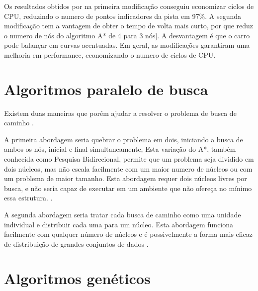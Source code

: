 \begin{minipage}{\linewidth}
	\label{fig:GameCarPista}
\end{minipage}

Os resultados obtidos por \cite{JungTing} na primeira modificação conseguiu economizar ciclos de CPU, reduzindo o numero de pontos indicadores da pista em 97\%. A segunda modificação tem a vantagem de obter o tempo de volta mais curto, por que reduz o numero de nós do algoritmo A* de 4 para 3 nós]. A desvantagem é que o carro pode balançar em curvas acentuadas. Em geral, as modificações garantiram uma melhoria em performance, economizando o numero de ciclos de CPU.


\section{Algoritmos paralelo de busca}

Existem duas maneiras que porém ajudar a resolver o problema de busca de caminho \cite{WilliamMiller}.

A primeira abordagem seria quebrar o problema em dois, iniciando a busca  de ambos os nós, inicial e final simultaneamente, Esta variação do A*, também conhecida como Pesquisa Bidirecional, permite que um problema seja dividido em dois núcleos, mas não escala facilmente com um maior numero de núcleos ou com um problema de maior tamanho. Esta abordagem requer dois núcleos livres por busca, e não seria capaz de executar em um ambiente que não ofereça no mínimo essa estrutura. \cite{Janie_Chang}.

A segunda abordagem seria tratar cada busca de caminho como uma unidade individual e distribuir cada uma para um núcleo.
Esta abordagem funciona facilmente com qualquer número de núcleos e é possivelmente a forma mais eficaz de distribuição de grandes conjuntos de dados \cite{Jad} \cite{WilliamMiller}.


\section{Algoritmos genéticos}

